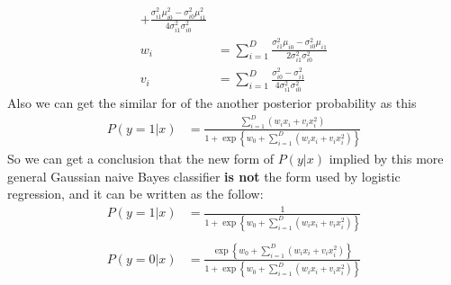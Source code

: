 \documentclass[UTF8,12pt, a4paper]{ctexart}
\begin{document}
\begin{tcolorbox}
\begin{align*}
{  +\frac{\sigma_{i1}^2\mu_{i0}^2-\sigma_{i0}^2\mu_{i1}^2}{4\sigma_{i1}^2\sigma_{i0}^2}}\\
  w_i &= \sum_{i=1}^{D}{\frac{\sigma_{i1}^2\mu_{i0}-\sigma_{i0}^2\mu_{i1}}{2\sigma_{i1}^2\sigma_{i0}^2}}\\
  v_i &= \sum_{i=1}^{D}{\frac{\sigma_{i0}^2-\sigma_{i1}^2}{4\sigma_{i1}^2\sigma_{i0}^2}} 
\end{align*}
Also we can get the similar for of the another posterior probability as this
\begin{equation}
  \begin{aligned}
    P(y=1|x) & = \frac{\sum_{i=1}^{D}{(w_ix_i + v_ix_i^2)}}{1+\exp\left\{
      w_0
      + \sum_{i=1}^{D}{(w_ix_i + v_ix_i^2)}
    \right\}}  
  \end{aligned}
\end{equation}
{\color{red} So we can get a conclusion that the new form of $P(y|x)$ implied by this more general Gaussian naive Bayes classifier {\color{black}\textbf{is not}} the form used by logistic regression,
and it can be written as the follow:
}
\begin{equation}
  \begin{aligned}
    P(y=1|x) & = \frac{1}{1+\exp\left\{
      w_0
      + \sum_{i=1}^{D}{(w_ix_i + v_ix_i^2)}
    \right\}}  \\
  \end{aligned}
\end{equation}
\begin{equation}
  \begin{aligned}
    P(y=0|x) & = \frac{\exp\left\{
      w_0
      + \sum_{i=1}^{D}{(w_ix_i + v_ix_i^2)}
    \right\}
    }{1+\exp\left\{
      w_0
      + \sum_{i=1}^{D}{(w_ix_i + v_ix_i^2)}
    \right\}}  \\
  \end{aligned}
\end{equation}
\end{tcolorbox}
\end{document}
